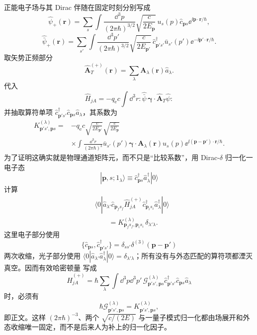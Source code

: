 \begin{derivation}[电磁顶角在模式基中的矩阵元]
正能电子场与其 Dirac 伴随在固定时刻分别写成
\[
\hat\psi_+(\mathbf r)
=\sum_s\int\frac{\dd^3p}{(2\pi\hbar)^{3/2}}
\sqrt{\frac{c}{2E_{\mathbf p}}}
\,u_s(p)\hat c_{\mathbf ps}
 \ee^{\ii\mathbf p\cdot\mathbf r/\hbar},
\]
\[
\hat{\bar\psi}_+(\mathbf r)
=\sum_{s'}\int\frac{\dd^3p'}{(2\pi\hbar)^{3/2}}
\sqrt{\frac{c}{2E_{\mathbf p'}}}
\,\hat c_{\mathbf p's'}^\dagger\bar u_{s'}(p')
 \ee^{-\ii\mathbf p'\cdot\mathbf r/\hbar}.
\]
取矢势正频部分
\[
\hat{\mathbf A}^{(+)}_T(\mathbf r)
=\sum_\lambda\mathbf A_\lambda(\mathbf r)\hat a_\lambda.
\]
代入
\[
\hat H_{jA}=-q_{\mathrm e} c\int\dd^3r:
\hat{\bar\psi}\,\boldsymbol\gamma\cdot\hat{\mathbf A}_T\hat\psi:
\]
并抽取算符单项
$\hat c_{\mathbf p's'}^\dagger\hat c_{\mathbf ps}\hat a_\lambda$，其系数为
\begin{align*}
K^{(\lambda)}_{\mathbf p's',\mathbf ps}
={}&-q_{\mathrm e} c
\sqrt{\frac{c}{2E_{\mathbf p'}}}
\sqrt{\frac{c}{2E_{\mathbf p}}}\\
&\times\int\frac{\dd^3r}{(2\pi\hbar)^3}
\bar u_{s'}(p')
\boldsymbol\gamma\cdot\mathbf A_\lambda(\mathbf r)
 u_s(p)
 \ee^{\ii(\mathbf p-\mathbf p')\cdot\mathbf r/\hbar}.
\end{align*}
为了证明这确实就是物理通道矩阵元，而不只是“比较系数”，用 Dirac-$\delta$ 归一化一电子态
\[
|\mathbf p,s;1_\lambda\rangle
\equiv
\hat c_{\mathbf ps}^\dagger\hat a_\lambda^\dagger|0\rangle
\]
计算
\begin{align*}
&\langle0|\hat a_{\lambda'}
\hat c_{\mathbf p_f s_f}
\hat H_{jA}^{(+)}
\hat c_{\mathbf p_i s_i}^\dagger
\hat a_\lambda^\dagger|0\rangle\\
&\qquad=
K^{(\lambda)}_{\mathbf p_f s_f,\mathbf p_i s_i}
\,\delta_{\lambda'\lambda}.
\end{align*}
这里电子部分使用
\[
\{\hat c_{\mathbf ps},\hat c_{\mathbf p's'}^\dagger\}
=\delta_{ss'}\delta^{(3)}(\mathbf p-\mathbf p')
\]
两次收缩，光子部分使用
$\langle0|\hat a_{\lambda'}\hat a_\lambda^\dagger|0\rangle=\delta_{\lambda'\lambda}$；所有没有与外态匹配的算符项都湮灭真空。因而有效哈密顿量 写成
\[
\hat H_{jA}^{(+)}
=\hbar\sum_\lambda\int\dd^3p\dd^3p'\,
\mathcal G^{(\lambda)}_{\mathbf p's',\mathbf ps}
\hat c_{\mathbf p's'}^\dagger\hat c_{\mathbf ps}\hat a_\lambda
\]
时，必须有
\[
\hbar\mathcal G^{(\lambda)}_{\mathbf p's',\mathbf ps}
=K^{(\lambda)}_{\mathbf p's',\mathbf ps},
\]
即正文。这样 $(2\pi\hbar)^{-3}$、两个 $\sqrt{c/(2E)}$ 与一量子模式归一化都由场展开和外态收缩唯一固定，而不是后来人为补上的归一化因子。
\end{derivation}
